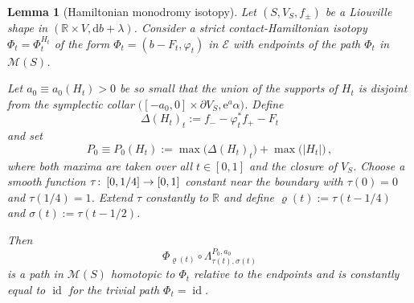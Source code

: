 \documentclass{amsart}
\newtheorem{lem}[prop]{Lemma}
\theoremstyle{definition}
\def\co{\colon\thinspace}
\newcommand{\rmd}{\mathrm d}
\newcommand{\rme}{\mathrm e}
\newcommand{\EE}{\mathcal E}
\newcommand{\MM}{\mathcal M}
\newcommand{\R}{\mathbb R}
\newcommand{\ra}{\rightarrow}
\DeclareMathOperator{\id}{\mathrm{id}}
\begin{document}
\begin{lem}[Hamiltonian monodromy isotopy]
\label{lem:pi1ofrelemistrivial}
Let $(S,V_S,f_{\pm})$ be a Liouville shape
in $(\R\times V,\rmd b+\lambda)$.
Consider a strict contact-Hamiltonian isotopy $\Phi_t=\Phi_t^{H_t}$
of the form $\Phi_t=(b-F_t,\varphi_t)$ in $\EE$
with endpoints of the path $\Phi_t$ in $\MM(S)$.

Let $a_0\equiv a_0(H_t)>0$ be so small
that the union of the supports of $H_t$ is disjoint from
the symplectic collar
$\big([-a_0,0]\times\partial V_S,\rme^a\alpha\big)$.
Define
\[
\Delta(H_t)_t:=f_--\varphi_t^*f_+-F_t
\]
and set
\[
P_0\equiv P_0(H_t):=
\max\big(\Delta(H_t)_t\big)+
\max\big(|H_t|\big)
\,,
\]
where both maxima are taken over all $t\in[0,1]$
and the closure of $V_S$.
Choose a smooth function $\tau\co[0,1/4]\ra[0,1]$ 
constant near the boundary
with $\tau(0)=0$ and $\tau(1/4)=1$.
Extend $\tau$ constantly to $\R$ and define
$\varrho(t):=\tau(t-1/4)$ and $\sigma(t):=\tau(t-1/2)$.

Then
\[
\Phi_{\varrho(t)}\circ\Lambda_{\tau(t),\sigma(t)}^{P_0,a_0}
\]
is a path in $\MM(S)$ homotopic to $\Phi_t$
relative to the endpoints
and is constantly equal to $\id$
for the trivial path $\Phi_t=\id$.
\end{lem}
\end{document}
